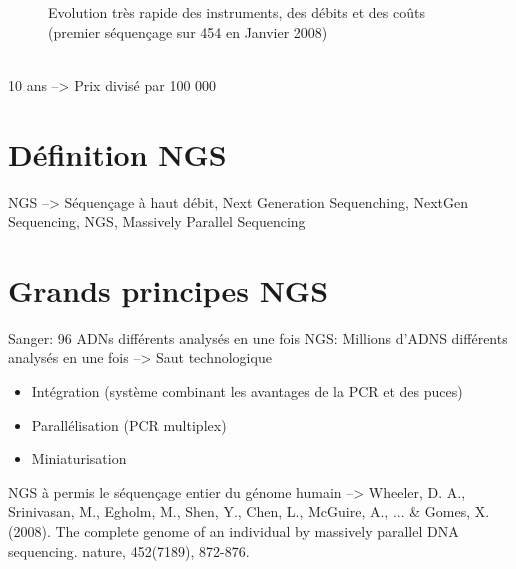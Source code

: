 \documentclass[a4paper]{article}
\begin{document}
\begin{figure}[!h]
\caption{Evolution très rapide des instruments, des débits et des coûts (premier séquençage sur 454 en Janvier 2008)}
\end{figure}

~~\\

10 ans --> Prix divisé par 100 000

\section{Définition NGS}

NGS --> Séquençage à haut débit, Next Generation Sequenching, NextGen Sequencing, NGS, Massively Parallel Sequencing

\section{Grands principes NGS}

Sanger: 96 ADNs différents analysés en une fois
NGS: Millions d'ADNS différents analysés en une fois 
--> Saut technologique

\begin{itemize}
\item Intégration (système combinant les avantages de la PCR et des puces)
\item Parallélisation (PCR multiplex)
\item Miniaturisation
\end{itemize}

NGS à permis le séquençage entier du génome humain --> Wheeler, D. A., Srinivasan, M., Egholm, M., Shen, Y., Chen, L., McGuire, A., ... & Gomes, X. (2008). The complete genome of an individual by massively parallel DNA sequencing. nature, 452(7189), 872-876.
\end{document}
